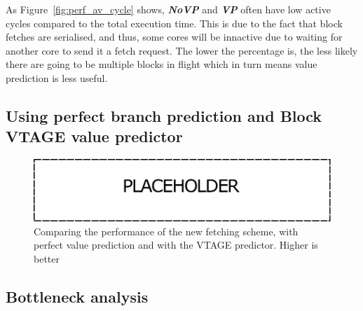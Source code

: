As Figure~\ref{fig:perf_av_cycle} shows, \textbf{\textit{NoVP}} and \textbf{\textit{VP}} often have low active cycles compared to the total execution time.
This is due to the fact that block fetches are serialised, and thus, some cores will be innactive due to waiting for another core to send it a fetch request.
The lower the percentage is, the less likely there are going to be multiple blocks in flight which in turn means value prediction is less useful.


\subsection{Using perfect branch prediction and Block VTAGE value predictor}
\begin{figure}[t]
    \centering
    \includegraphics[width=1\textwidth]{chapter3/graphics/wip.pdf}
    \caption{Comparing the performance of the new fetching scheme, with perfect value prediction and with the VTAGE predictor. Higher is better}
    \label{fig:perf_pred}
	\vspace{1em}
\end{figure}

\subsection{Bottleneck analysis}